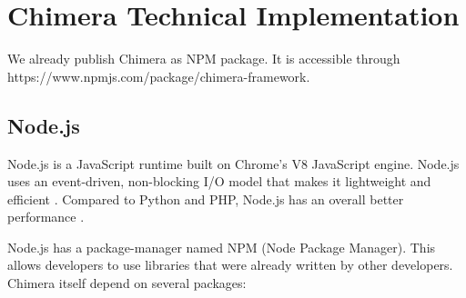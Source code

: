 \documentclass[conference]{IEEEtran}
\begin{document}
\section{Chimera Technical Implementation}

We already publish Chimera as NPM package. It is accessible through 
https://www.npmjs.com/package/chimera-framework.


\subsection{Node.js}

Node.js is a JavaScript runtime built on Chrome's V8 JavaScript engine. Node.js uses an event-driven, non-blocking I/O model that makes it lightweight and efficient \cite{nodejs}. Compared to Python and PHP, Node.js has an overall better performance
\cite{lei2014performance}.

Node.js has a package-manager named NPM (Node Package Manager). This allows developers
to use libraries that were already written by other developers. Chimera itself depend
on several packages:
\end{document}
